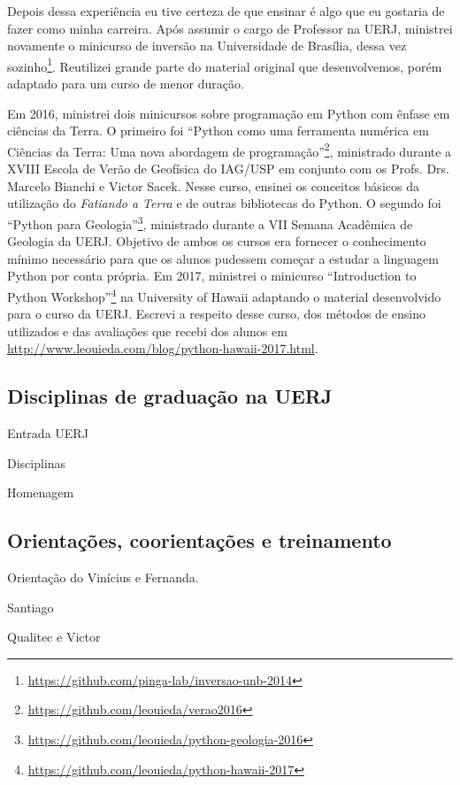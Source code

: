 Depois dessa experiência eu tive certeza de que ensinar é algo que eu gostaria
de fazer como minha carreira.
Após assumir o cargo de Professor na UERJ, ministrei novamente o minicurso de
inversão na Universidade de Brasília, dessa vez
sozinho\footnote{\url{https://github.com/pinga-lab/inversao-unb-2014}}.
Reutilizei grande parte do material original que desenvolvemos, porém adaptado
para um curso de menor duração.

Em 2016, ministrei dois minicursos sobre programação em Python com ênfase em
ciências da Terra.
O primeiro foi ``Python como uma ferramenta numérica em Ciências da
Terra: Uma nova abordagem de
programação''\footnote{\url{https://github.com/leouieda/verao2016}}, ministrado
durante
a XVIII Escola de Verão de Geofísica do IAG/USP em conjunto com os Profs. Drs.
Marcelo Bianchi e Victor Sacek.
Nesse curso, ensinei os conceitos básicos da utilização do \textit{Fatiando a
Terra} e de outras bibliotecas do Python.
O segundo foi ``Python para
Geologia''\footnote{\url{https://github.com/leouieda/python-geologia-2016}},
ministrado durante a
VII Semana Acadêmica de Geologia da UERJ.
Objetivo de ambos os cursos era fornecer o conhecimento mínimo necessário para
que os alunos pudessem começar a estudar a linguagem Python por conta própria.
Em 2017, ministrei o minicurso ``Introduction to Python
Workshop''\footnote{\url{https://github.com/leouieda/python-hawaii-2017}} na
University of Hawaii adaptando o material desenvolvido para o curso da UERJ.
Escrevi a respeito desse curso, dos métodos de ensino utilizados e das
avaliações que recebi dos alunos em
\url{http://www.leouieda.com/blog/python-hawaii-2017.html}.


\subsection{Disciplinas de graduação na UERJ}

Entrada UERJ

Disciplinas

Homenagem


\subsection{Orientações, coorientações e treinamento}

Orientação do Vinícius e Fernanda.

Santiago

Qualitec e Victor
